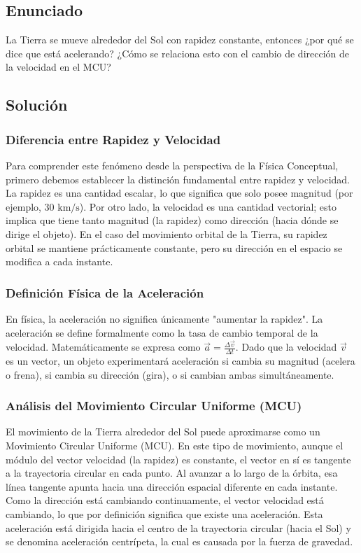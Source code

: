 \documentclass{article}
\begin{document}
\subsection*{Enunciado}
La Tierra se mueve alrededor del Sol con rapidez constante, entonces ¿por qué se dice que está acelerando? ¿Cómo se relaciona esto con el cambio de dirección de la velocidad en el MCU?

\subsection*{Solución}

\subsubsection*{Diferencia entre Rapidez y Velocidad}
Para comprender este fenómeno desde la perspectiva de la Física Conceptual, primero debemos establecer la distinción fundamental entre rapidez y velocidad. La rapidez es una cantidad escalar, lo que significa que solo posee magnitud (por ejemplo, $30 \text{ km/s}$). Por otro lado, la velocidad es una cantidad vectorial; esto implica que tiene tanto magnitud (la rapidez) como dirección (hacia dónde se dirige el objeto). En el caso del movimiento orbital de la Tierra, su rapidez orbital se mantiene prácticamente constante, pero su dirección en el espacio se modifica a cada instante.

\subsubsection*{Definición Física de la Aceleración}
En física, la aceleración no significa únicamente "aumentar la rapidez". La aceleración se define formalmente como la tasa de cambio temporal de la velocidad. Matemáticamente se expresa como $\vec{a} = \frac{\Delta\vec{v}}{\Delta t}$. Dado que la velocidad $\vec{v}$ es un vector, un objeto experimentará aceleración si cambia su magnitud (acelera o frena), si cambia su dirección (gira), o si cambian ambas simultáneamente. 

\subsubsection*{Análisis del Movimiento Circular Uniforme (MCU)}
El movimiento de la Tierra alrededor del Sol puede aproximarse como un Movimiento Circular Uniforme (MCU). En este tipo de movimiento, aunque el módulo del vector velocidad (la rapidez) es constante, el vector en sí es tangente a la trayectoria circular en cada punto. Al avanzar a lo largo de la órbita, esa línea tangente apunta hacia una dirección espacial diferente en cada instante. Como la dirección está cambiando continuamente, el vector velocidad está cambiando, lo que por definición significa que existe una aceleración. Esta aceleración está dirigida hacia el centro de la trayectoria circular (hacia el Sol) y se denomina aceleración centrípeta, la cual es causada por la fuerza de gravedad.
\end{document}
